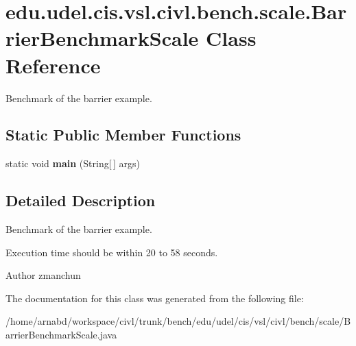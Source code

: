 \hypertarget{classedu_1_1udel_1_1cis_1_1vsl_1_1civl_1_1bench_1_1scale_1_1BarrierBenchmarkScale}{}\section{edu.\+udel.\+cis.\+vsl.\+civl.\+bench.\+scale.\+Barrier\+Benchmark\+Scale Class Reference}
\label{classedu_1_1udel_1_1cis_1_1vsl_1_1civl_1_1bench_1_1scale_1_1BarrierBenchmarkScale}


Benchmark of the barrier example.  


\subsection*{Static Public Member Functions}
\begin{DoxyCompactItemize}
\item 
\hypertarget{classedu_1_1udel_1_1cis_1_1vsl_1_1civl_1_1bench_1_1scale_1_1BarrierBenchmarkScale_abccf749cdfbc6bb7563536f0f97a6223}{}static void {\bfseries main} (String\mbox{[}$\,$\mbox{]} args)\label{classedu_1_1udel_1_1cis_1_1vsl_1_1civl_1_1bench_1_1scale_1_1BarrierBenchmarkScale_abccf749cdfbc6bb7563536f0f97a6223}

\end{DoxyCompactItemize}


\subsection{Detailed Description}
Benchmark of the barrier example. 

Execution time should be within 20 to 58 seconds.

\begin{DoxyAuthor}{Author}
zmanchun 
\end{DoxyAuthor}


The documentation for this class was generated from the following file\+:\begin{DoxyCompactItemize}
\item 
/home/arnabd/workspace/civl/trunk/bench/edu/udel/cis/vsl/civl/bench/scale/Barrier\+Benchmark\+Scale.\+java\end{DoxyCompactItemize}
